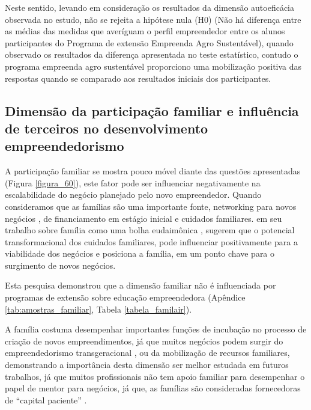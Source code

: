 Neste sentido, levando em consideração os resultados da dimensão autoeficácia observada no estudo, não se rejeita a hipótese nula (H0) (Não há diferença entre as médias das medidas que averíguam o perfil empreendedor entre os alunos participantes do Programa de extensão Empreenda Agro Sustentável), quando observado os resultados da diferença apresentada no teste estatístico, contudo o programa empreenda agro sustentável proporciono uma mobilização positiva das respostas quando se comparado aos resultados iniciais dos participantes.



\subsection{Dimensão da participação familiar e influência de terceiros no desenvolvimento empreendedorismo}

A participação familiar se mostra pouco móvel diante das questões apresentadas (Figura \ref{figura_60}), este fator pode ser influenciar negativamente na escalabilidade do negócio planejado pelo novo empreendedor. Quando consideramos que as famílias são uma importante fonte, networking para novos negócios \cite{dieguez-soto_does_2019,raza_influence_2019,kupp_when_2019}, de financiamento em estágio inicial \cite{dieguez-soto_does_2019,edelman_impact_2016} e cuidados familiares.  em seu trabalho sobre família como uma bolha eudaimônica \cite{puzi_transgenerational_2020}, sugerem que o potencial transformacional dos cuidados familiares, pode influenciar positivamente para a viabilidade dos negócios e posiciona a família, em um ponto chave para o surgimento de novos negócios. 

Esta pesquisa demonstrou que a dimensão familiar não é influenciada por programas de extensão sobre educação empreendedora (Apêndice \ref{tab:amostras_familiar}, Tabela \ref{tabela_familair}).

A família costuma desempenhar importantes funções de incubação no processo de criação de novos empreendimentos, já que muitos negócios podem surgir do empreendedorismo transgeracional \cite{puzi_transgenerational_2020,meliou_family_2020}, ou da mobilização de recursos familiares, demonstrando a importância desta dimensão ser melhor estudada em futuros trabalhos, já que muitos profissionais não tem apoio familiar para desempenhar o papel de mentor para negócios, já que, as famílias são consideradas fornecedoras de “capital paciente” \cite{lumpkin_longterm_2011}. 





